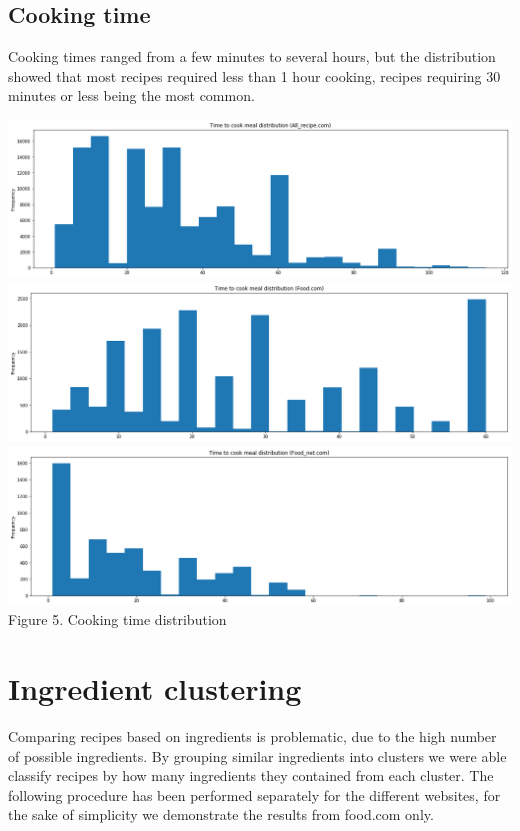 \documentclass[11pt]{article}
\begin{document}
\subsection{Cooking time}

Cooking times ranged from a few minutes to several hours, but the distribution showed that most recipes required less than 1 hour cooking, recipes requiring 30 minutes or less being the most common.

\vspace{5mm}
\begin{center}
\includegraphics[scale=0.06]{cookingtime-1}
\includegraphics[scale=0.06]{cookingtime-2}
\includegraphics[scale=0.06]{cookingtime-3}
\label{visalization-cookingtime} Figure 5. Cooking time distribution
\end{center}
\vspace{5mm}

\section{Ingredient clustering}

Comparing recipes based on ingredients is problematic, due to the high number of possible ingredients. By grouping similar ingredients into clusters we were able classify recipes by how many ingredients they contained from each cluster. The following procedure has been performed separately for the different websites, for the sake of simplicity we demonstrate the results from food.com only.
\end{document}
